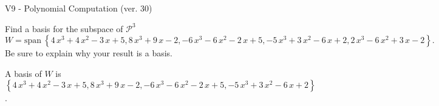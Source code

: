 \begin{exercise}
  \begin{exerciseTitle}V9 - Polynomial Computation (ver. 30)\end{exerciseTitle}
  \begin{exerciseStatement}
    Find a basis for the subspace of \(\mathcal{P}^3\) 
\[W=\mathrm{span}\ \left\{4 \, x^{3} + 4 \, x^{2} - 3 \, x + 5 , 8 \, x^{3} + 9 \, x - 2 , -6 \, x^{3} - 6 \, x^{2} - 2 \, x + 5 , -5 \, x^{3} + 3 \, x^{2} - 6 \, x + 2 , 2 \, x^{3} - 6 \, x^{2} + 3 \, x - 2\right\}.\]
 Be sure to explain why your result is a basis.


  \end{exerciseStatement}
  \begin{exerciseAnswer}
   A basis of \(W\) is  \(\left\{4 \, x^{3} + 4 \, x^{2} - 3 \, x + 5 , 8 \, x^{3} + 9 \, x - 2 , -6 \, x^{3} - 6 \, x^{2} - 2 \, x + 5 , -5 \, x^{3} + 3 \, x^{2} - 6 \, x + 2\right\}\).
  


  \end{exerciseAnswer}
\end{exercise}